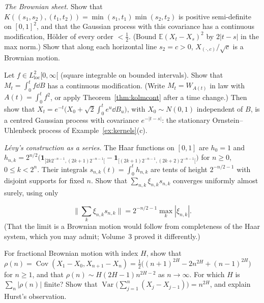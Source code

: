 \begin{exercise}[$\star\star$]\label{ex:sheet}
\emph{The Brownian sheet.} Show that $K((s_1,s_2),(t_1,t_2))=\min(s_1,t_1)\min(s_2,t_2)$ is positive semi-definite on $[0,1]^2$, and that the Gaussian process with this covariance has a continuous modification,
H\"older of every order $<\frac12$. (Bound $\mathbb E(X_t-X_s)^2$ by $2|t-s|$ in the max norm.) Show that along each horizontal line $s_2=c>0$, $X_{(\cdot,c)}/\sqrt c$ is a Brownian motion.
\end{exercise}

\begin{exercise}[$\star\star$]\label{ex:ou}
Let $f\in L^2_{\mathrm{loc}}[0,\infty[$ (square integrable on bounded intervals). Show that $M_t=\int_0^tf\dd B$ has a continuous modification. (Write $M_t=W_{A(t)}$ in law with $A(t)=\int_0^tf^2$, or apply
Theorem~\ref{thm:kolmcont} after a time change.) Then show that $X_t=e^{-t}\bigl(X_0+\sqrt2\int_0^te^u\dd B_u\bigr)$, with $X_0\sim N(0,1)$ independent of $B$, is a centred Gaussian process with covariance $e^{-|t-s|}$:
the stationary Ornstein--Uhlenbeck process of Example~\ref{ex:kernels}(c).
\end{exercise}

\begin{exercise}[$\star\star$]\label{ex:haar}
\emph{L\'evy's construction as a series.} The Haar functions on $[0,1]$ are $h_0=1$ and $h_{n,k}=2^{n/2}\bigl(\mathbf 1_{[2k2^{-n-1},(2k+1)2^{-n-1}[}-\mathbf 1_{[(2k+1)2^{-n-1},(2k+2)2^{-n-1}[}\bigr)$ for $n\ge0$, $0\le k<2^n$.
Their integrals $s_{n,k}(t)=\int_0^th_{n,k}$ are tents of height $2^{-n/2-1}$ with disjoint supports for fixed $n$. Show that $\sum_{n,k}\xi_{n,k}s_{n,k}$ converges uniformly almost surely, using only

\[
\|\sum_k\xi_{n,k}s_{n,k}\|=2^{-n/2-1}\max_k|\xi_{n,k}|.
\]
(That the limit is a Brownian motion would follow from completeness of the Haar system, which you may admit; Volume~3 proved it differently.)
\end{exercise}

\begin{exercise}[$\star\star$]\label{ex:fbmcorr}
For fractional Brownian motion with index $H$, show that $\rho(n)=\operatorname{Cov}(X_1-X_0,X_{n+1}-X_n)=\frac12\bigl((n+1)^{2H}-2n^{2H}+(n-1)^{2H}\bigr)$ for $n\ge1$, and that $\rho(n)\sim H(2H-1)n^{2H-2}$ as $n\to\infty$. For
which $H$ is $\sum_n|\rho(n)|$ finite? Show that $\operatorname{Var}\bigl(\sum_{j=1}^n(X_j-X_{j-1})\bigr)=n^{2H}$, and explain Hurst's observation.
\end{exercise}

